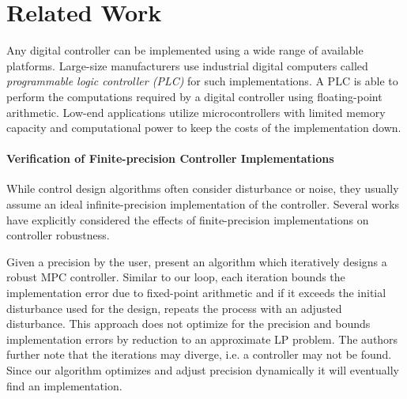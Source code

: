 \section{Related Work}

Any digital controller can be implemented using a wide range of available
platforms. Large-size manufacturers use industrial digital computers called
\emph{programmable logic controller (PLC)} for such implementations. A PLC is
able to perform the computations required by a digital controller using
floating-point arithmetic.  Low-end applications utilize microcontrollers with
limited memory capacity and computational power to keep the costs of the
implementation down.

\paragraph{Verification of Finite-precision Controller Implementations}

While control design algorithms often consider disturbance or noise, they
usually assume an ideal infinite-precision implementation of the controller.
Several works have explicitly considered the effects of finite-precision
implementations on controller robustness.

Given a precision by the user, \citet{imperialrmpc} present an algorithm which
iteratively designs a robust MPC controller. Similar to our loop, each iteration
bounds the implementation error due to fixed-point arithmetic and if it exceeds
the initial disturbance used for the design, repeats the process with an
adjusted disturbance. This approach does not optimize for the precision and
bounds implementation errors by reduction to an approximate LP problem. The
authors further note that the iterations may diverge, i.e. a controller may not
be found. Since our algorithm optimizes and adjust precision dynamically it will
eventually find an implementation.

